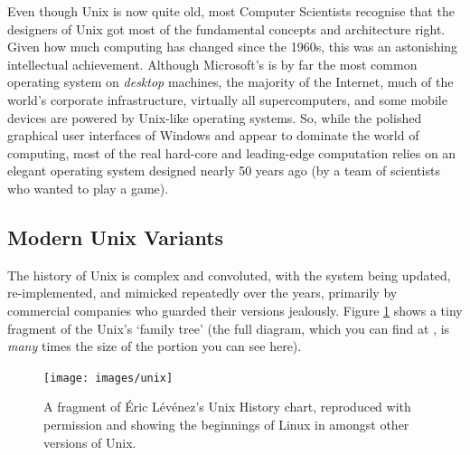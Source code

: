 
Even though Unix is now quite old, most Computer Scientists recognise
that the designers of Unix got most of the fundamental concepts and
architecture right. Given how much computing has changed since the
1960s, this was an astonishing intellectual achievement. Although
Microsoft's  is by far the most
common operating system on \emph{desktop} machines, the majority of
the Internet, much of the world's corporate infrastructure, virtually
all supercomputers, and some mobile devices are powered by Unix-like
operating systems. So, while the polished graphical user interfaces of
Windows and  appear to dominate the world of
computing, most of the real hard-core and leading-edge computation
relies on an elegant operating system designed nearly 50 years ago (by
a team of scientists who wanted to play a game).

\subsection{Modern Unix Variants}
\label{sec:modern-unix-variants}


The history of Unix is complex and convoluted, with the system being updated, re-implemented, and mimicked repeatedly over the years, primarily by commercial companies who guarded their versions jealously. Figure \ref{fig:unix-history} shows a tiny fragment of the Unix's `family tree' (the full diagram, which you can find at , is \emph{many} times the size of the portion you can see here).

\begin{figure}
  \begin{center}
    \texttt{[image: images/unix]}
  \end{center}
\caption{A fragment of \'{E}ric L\'{e}v\'{e}nez's Unix History chart, reproduced with permission and showing the beginnings of Linux in amongst other versions of Unix.}
\label{fig:unix-history}
\end{figure}

